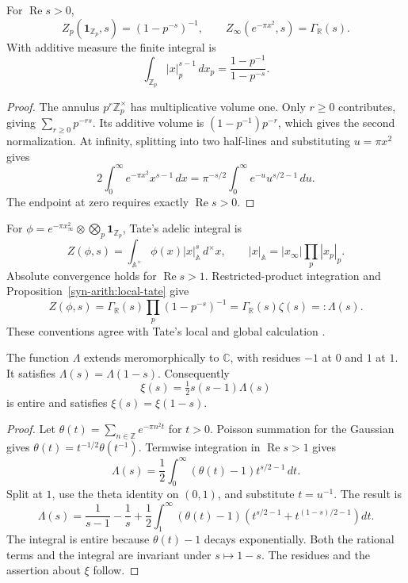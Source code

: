 \begin{proposition}
\label{syn-arith:local-tate}
For $\operatorname{Re}s>0$,
\[
 Z_p(\mathbf1_{\mathbb Z_p},s)=(1-p^{-s})^{-1},\qquad
 Z_\infty(e^{-\pi x^2},s)=\Gamma_{\mathbb R}(s).
\]
With additive measure the finite integral is
\[
 \int_{\mathbb Z_p}|x|_p^{s-1}\,dx_p
 =\frac{1-p^{-1}}{1-p^{-s}}.
\]
\end{proposition}
\begin{proof}
The annulus $p^r\mathbb Z_p^\times$ has multiplicative volume one.
Only $r\geq0$ contributes, giving $\sum_{r\geq0}p^{-rs}$.
Its additive volume is $(1-p^{-1})p^{-r}$, which gives the second normalization.
At infinity, splitting into two half-lines and substituting $u=\pi x^2$ gives
\[
 2\int_0^\infty e^{-\pi x^2}x^{s-1}\,dx
 =\pi^{-s/2}\int_0^\infty e^{-u}u^{s/2-1}\,du.
\]
The endpoint at zero requires exactly $\operatorname{Re}s>0$.
\end{proof}

For $\phi=e^{-\pi x_\infty^2}\otimes\bigotimes_p\mathbf1_{\mathbb Z_p}$,
Tate's adelic integral is
\[
 Z(\phi,s)=\int_{\mathbb A^\times}\phi(x)|x|_{\mathbb A}^s\,d^\times x,
 \qquad |x|_{\mathbb A}=|x_\infty|\prod_p|x_p|_p.
\]
Absolute convergence holds for $\operatorname{Re}s>1$.  Restricted-product
integration and Proposition~\ref{syn-arith:local-tate} give
\[
 Z(\phi,s)=\Gamma_{\mathbb R}(s)\prod_p(1-p^{-s})^{-1}
          =\Gamma_{\mathbb R}(s)\zeta(s)=:\Lambda(s).
\]
These conventions agree with Tate's local and global calculation
\cite[\S\S2.2--2.5, pp.~316--321; \S4.4, Main Theorem~4.4.1, p.~339]{syn-arith:Tate}.

\begin{theorem}
\label{syn-arith:theta}
The function $\Lambda$ extends meromorphically to $\mathbb C$,
with residues $-1$ at $0$ and $1$ at $1$.  It satisfies
$\Lambda(s)=\Lambda(1-s)$.  Consequently
\[
 \xi(s)=\tfrac12s(s-1)\Lambda(s)
\]
is entire and satisfies $\xi(s)=\xi(1-s)$.
\end{theorem}
\begin{proof}
Let $\theta(t)=\sum_{n\in\mathbb Z}e^{-\pi n^2t}$ for $t>0$.
Poisson summation for the Gaussian gives
$\theta(t)=t^{-1/2}\theta(t^{-1})$.  Termwise integration in
$\operatorname{Re}s>1$ gives
\[
 \Lambda(s)=\frac12\int_0^\infty(\theta(t)-1)t^{s/2-1}\,dt.
\]
Split at $1$, use the theta identity on $(0,1)$, and substitute $t=u^{-1}$.
The result is
\begin{equation}
 \Lambda(s)=\frac1{s-1}-\frac1s+
 \frac12\int_1^\infty(\theta(t)-1)
       \left(t^{s/2-1}+t^{(1-s)/2-1}\right)dt.
 \label{syn-arith:theta-continuation}
\end{equation}
The integral is entire because $\theta(t)-1$ decays exponentially.
Both the rational terms and the integral are invariant under $s\mapsto1-s$.
The residues and the assertion about $\xi$ follow.
\end{proof}

